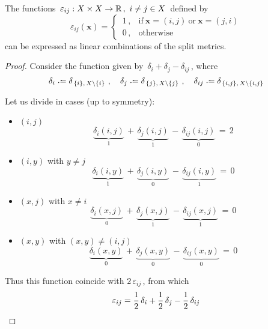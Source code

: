 \documentclass[./main.tex]{subfiles}
\begin{document}
\begin{lemma} \label{lemma:epssplit}
    The functions $\, \varepsilon_{ij} : {X \times X} \to \mathbb{R} \,,\ i \neq j \in X \,$ defined by
    \[ \varepsilon_{ij}(\bm{x}) =
        \begin{cases}
        \, 1 \,,    & \text{if}\ \bm{x} = (i,j)\ \text{or}\ \bm{x} = (j,i) \\
        \, 0 \,,    & \text{otherwise}
        \end{cases} \]
    can be expressed as linear combinations of the split metrics.
\end{lemma}
\begin{proof}
    Consider the function given by $\, \delta_{i} + \delta_{j} - \delta_{ij} \,$, where
    \[ \delta_{i} \defeq \delta_{\, \{i\},\, X \setminus \{i\}}\ , \quad 
        \delta_{j} \defeq \delta_{\, \{j\},\, X \setminus \{j\}}\ , \quad 
        \delta_{ij} \defeq \delta_{\, \{i,j\},\, X \setminus \{i,j\}} \]

    Let us divide in cases (up to symmetry):
    \begin{itemize}[noitemsep]
        \item $(i,j)$
        \[ \underbrace{\delta_{i}(i,j)}_{1} \,+\, \underbrace{\delta_{j}(i,j)}_{1} \,-\, \underbrace{\delta_{ij}(i,j)}_{0} \,=\, 2 \]
        \item $(i,y)$ with $y \neq j$
        \[ \underbrace{\delta_{i}(i,y)}_{1} \,+\, \underbrace{\delta_{j}(i,y)}_{0} \,-\, \underbrace{\delta_{ij}(i,y)}_{1} \,=\, 0 \]
        \item $(x,j)$ with $x \neq i$
        \[ \underbrace{\delta_{i}(x,j)}_{0} \,+\, \underbrace{\delta_{j}(x,j)}_{1} \,-\, \underbrace{\delta_{ij}(x,j)}_{1} \,=\, 0 \]
        \item $(x,y)$ with $(x,y) \neq (i,j)$
        \[ \underbrace{\delta_{i}(x,y)}_{0} \,+\, \underbrace{\delta_{j}(x,y)}_{0} \,-\, \underbrace{\delta_{ij}(x,y)}_{0} \,=\, 0 \]
    \end{itemize}
    Thus this function coincide with $2\, \varepsilon_{ij}\,$, from which
    \[ \varepsilon_{ij} = \frac{1}{2}\, \delta_{i} + \frac{1}{2}\, \delta_{j} - \frac{1}{2}\, \delta_{ij} \nospblw \]
\end{proof}

\clearpage
\end{document}
